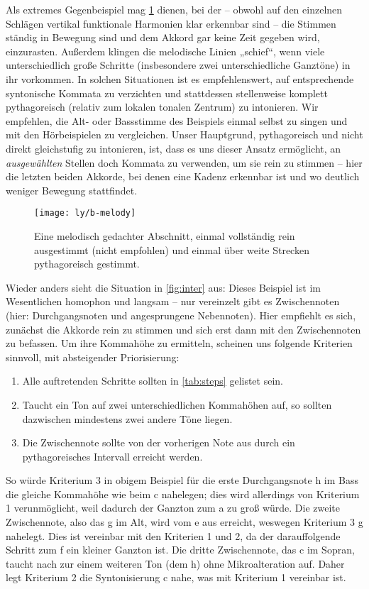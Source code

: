 Als extremes Gegenbeispiel mag \cref{fig:melody} dienen, bei der – obwohl auf
den einzelnen Schlägen vertikal funktionale Harmonien klar erkennbar sind – die
Stimmen ständig in Bewegung sind und dem Akkord gar keine Zeit gegeben wird,
einzurasten. Außerdem klingen die melodische Linien „schief“, wenn viele
unterschiedlich große Schritte (insbesondere zwei unterschiedliche Ganztöne) in
ihr vorkommen.  In solchen Situationen ist es empfehlenswert, auf entsprechende
syntonische Kommata zu verzichten und stattdessen stellenweise komplett
pythagoreisch (relativ zum lokalen tonalen Zentrum) zu intonieren.  Wir
empfehlen, die Alt- oder Bassstimme des Beispiels einmal selbst zu singen und
mit den Hörbeispielen zu vergleichen.  Unser Hauptgrund, pythagoreisch und nicht
direkt gleichstufig zu intonieren, ist, dass es uns dieser Ansatz ermöglicht, an
\emph{ausgewählten} Stellen doch Kommata zu verwenden, um sie rein zu stimmen –
hier die letzten beiden Akkorde, bei denen eine Kadenz erkennbar ist und wo
deutlich weniger Bewegung stattfindet.

\begin{figure}
  \centering
  \texttt{[image: ly/b-melody]}
  \caption{Eine melodisch gedachter Abschnitt, einmal
    vollständig rein ausgestimmt (nicht empfohlen) und einmal über weite
    Strecken pythagoreisch gestimmt.}\label{fig:melody}
\end{figure}

Wieder anders sieht die Situation in \cref{fig:inter} aus: Dieses Beispiel ist
im Wesentlichen homophon und langsam – nur vereinzelt gibt es Zwischennoten
(hier: Durchgangsnoten und angesprungene Nebennoten). Hier empfiehlt es sich,
zunächst die Akkorde rein zu stimmen und sich erst dann mit den Zwischennoten zu
befassen. Um ihre Kommahöhe zu ermitteln, scheinen uns folgende Kriterien
sinnvoll, mit absteigender Priorisierung:
\begin{enumerate}
\item Alle auftretenden Schritte sollten in \cref{tab:steps} gelistet sein.
\item Taucht ein Ton auf zwei unterschiedlichen Kommahöhen auf, so sollten
  dazwischen mindestens zwei andere Töne liegen.
\item Die Zwischennote sollte von der vorherigen Note aus durch ein
  pythagoreisches Intervall erreicht werden.
\end{enumerate}
So würde Kriterium 3 in obigem Beispiel für die erste Durchgangsnote h im Bass
die gleiche Kommahöhe wie beim c nahelegen; dies wird allerdings von Kriterium 1
verunmöglicht, weil dadurch der Ganzton zum \naturalm a zu groß würde. Die
zweite Zwischennote, also das g im Alt, wird vom \naturalm e aus erreicht,
weswegen Kriterium 3 \naturalm g nahelegt. Dies ist vereinbar mit den Kriterien
1 und 2, da der darauffolgende Schritt zum f ein kleiner Ganzton ist. Die dritte
Zwischennote, das c im Sopran, taucht nach zur einem weiteren Ton (dem \naturalm
h) ohne Mikroalteration auf. Daher legt Kriterium 2 die Syntonisierung \natural
c nahe, was mit Kriterium 1 vereinbar ist.

